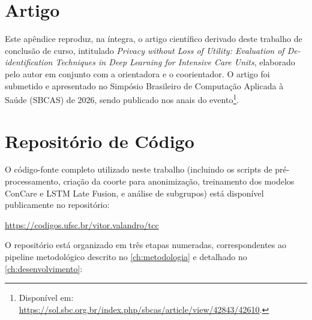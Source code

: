 \chapter{Artigo}
\label{ch:apendice-artigo}

Este apêndice reproduz, na íntegra, o artigo científico derivado deste trabalho de conclusão de curso, intitulado \textit{Privacy without Loss of Utility: Evaluation of De-identification Techniques in Deep Learning for Intensive Care Units}, elaborado pelo autor em conjunto com a orientadora e o coorientador. O artigo foi submetido e apresentado no Simpósio Brasileiro de Computação Aplicada à Saúde (SBCAS) de 2026, sendo publicado nos anais do evento\footnote{Disponível em: \url{https://sol.sbc.org.br/index.php/sbcas/article/view/42843/42610}.}.



\chapter{Repositório de Código}
\label{ch:apendice-repositorio}

O código-fonte completo utilizado neste trabalho (incluindo os scripts de pré-processamento, criação da coorte para anonimização, treinamento dos modelos ConCare e LSTM Late Fusion, e análise de subgrupos) está disponível publicamente no repositório:

\begin{center}
    \url{https://codigos.ufsc.br/vitor.valandro/tcc}
\end{center}

O repositório está organizado em três etapas numeradas, correspondentes ao pipeline metodológico descrito no \autoref{ch:metodologia} e detalhado no \autoref{ch:desenvolvimento}:

